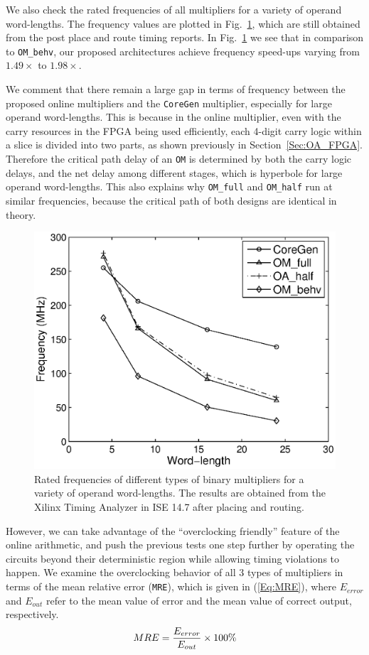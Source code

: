 \documentclass[conference]{IEEEtran}
\begin{document}
We also check the rated frequencies of all multipliers for a variety of operand word-lengths. The frequency values are plotted in Fig.~\ref{Fig:OM_Freq}, which are still obtained from the post place and route timing reports. In Fig.~\ref{Fig:OM_Freq} we see that in comparison to \texttt{OM\_behv}, our proposed architectures achieve frequency speed-ups varying from $1.49\times$ to $1.98\times$.

We comment that there remain a large gap in terms of frequency between the proposed online multipliers and the \texttt{CoreGen} multiplier, especially for large operand word-lengths. This is because in the online multiplier, even with the carry resources in the FPGA being used efficiently, each 4-digit carry logic within a slice is divided into two parts, as shown previously in Section~\ref{Sec:OA_FPGA}. Therefore the critical path delay of an \texttt{OM} is determined by both the carry logic delays, and the net delay among different stages, which is hyperbole for large operand word-lengths. This also explains why \texttt{OM\_full} and \texttt{OM\_half} run at similar frequencies, because the critical path of both designs are identical in theory.

\begin{figure}[tbp]
	\centering
	\includegraphics[width=.48\textwidth]{./Figures/Exp/OM_Freq2.eps}
	\vspace{-3ex}
	\caption{Rated frequencies of different types of binary multipliers for a variety of operand word-lengths. The results are obtained from the Xilinx Timing Analyzer in ISE 14.7 after placing and routing.}
	\vspace{-2ex}
	\label{Fig:OM_Freq}
\end{figure}

However, we can take advantage of the ``overclocking friendly'' feature of the online arithmetic, and push the previous tests one step further by operating the circuits beyond their deterministic region while allowing timing violations to happen. We examine the overclocking behavior of all 3 types of multipliers in terms of the mean relative error (\texttt{MRE}), which is given in (\ref{Eq:MRE}), where $E_{error}$ and $E_{out}$ refer to the mean value of error and the mean value of correct output, respectively.
%
\begin{eqnarray}\label{Eq:MRE}
  MRE=\frac{E_{error}}{E_{out}}\times100\%
  \vspace{-1.5ex}
\end{eqnarray}
\end{document}
